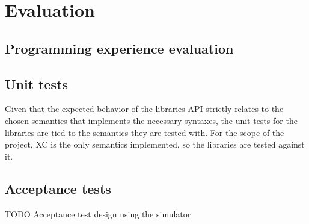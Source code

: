 \chapter{Evaluation}
\label{chap:evaluation}

\section{Programming experience evaluation}



\section{Unit tests}

Given that the expected behavior of the libraries \ac{API} strictly relates to the chosen semantics that implements the necessary syntaxes, the unit tests for the libraries are tied to the semantics they are tested with.
%
For the scope of the project, \ac{XC} is the only semantics implemented, so the libraries are tested against it.
%

\section{Acceptance tests}

TODO Acceptance test design using the simulator
